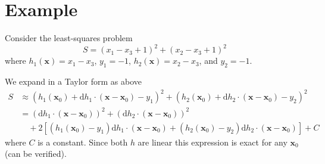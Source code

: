 \section{Example}

Consider the least-squares problem
$$
  S = (x_1 - x_3 + 1)^2 + (x_2 - x_3 + 1)^2
$$
where $h_1(\mathbf{x}) = x_1 - x_3$, $y_1 = -1$, $h_2(\mathbf{x}) = x_2 - x_3$, and $y_2 = -1$.

We expand in a Taylor form as above
$$
  \begin{aligned}
    S & \approx \left( h_1(\mathbf{x}_0) + \mathrm{d} h_1 \cdot (\mathbf{x} - \mathbf{x}_0) - y_1 \right)^2 +  \left( h_2(\mathbf{x}_0) + \mathrm{d} h_2 \cdot (\mathbf{x} - \mathbf{x}_0) - y_2 \right)^2 \\
      & = (\mathrm{d} h_1 \cdot (\mathbf{x} - \mathbf{x}_0))^2 + (\mathrm{d} h_2 \cdot (\mathbf{x} - \mathbf{x}_0) )^2                                                                                     \\
      & \quad + 2 \left[ (h_1(\mathbf{x}_0) - y_1) \mathrm{d} h_1 \cdot (\mathbf{x} - \mathbf{x}_0) + (h_2(\mathbf{x}_0) - y_2) \mathrm{d} h_2 \cdot (\mathbf{x} - \mathbf{x}_0)\right] + C
  \end{aligned}
$$
where $C$ is a constant. Since both $h$ are linear this expression is exact for any $\mathbf{x}_0$ (can be verified).

